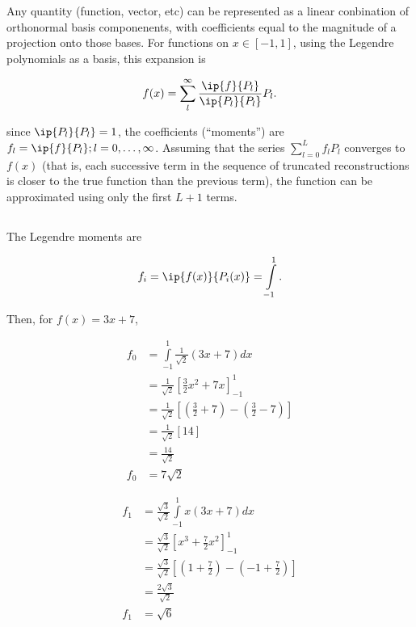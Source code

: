 \documentclass{hw-template}
\begin{document}
Any quantity (function, vector, etc) can be represented as a linear conbination of orthonormal basis componenents, with coefficients equal to the magnitude of a projection onto those bases. For functions on $x\in[-1, 1]$, using the Legendre polynomials as a basis, this expansion is

\begin{equation}
    f(x) = \sum_l^\infty \frac{\ip{f}{P_l}}{\ip{P_l}{P_l}} P_l.
\end{equation}

since $\ip{P_l}{P_l} = 1$, the coefficients (``moments'') are $f_l = \ip{f}{P_l}; l=0, \dots, \infty$. Assuming that the series $\sum_{l=0}^L f_lP_l$ converges to $f(x)$ (that is, each successive term in the sequence of truncated reconstructions is closer to the true function than the previous term), the function can be approximated using only the first $L+1$ terms.

\subsection{}

The Legendre moments are

\begin{equation}
    f_i = \ip{f(x)}{P_i(x)} = \int\limits_{-1}^{1}.
\end{equation}

Then, for $f(x) = 3x+7$, 

\begin{equation}
    \begin{aligned}
      f_0 &= \int\limits_{-1}^{1} \frac{1}{\sqrt{2}}\left(3x + 7 \right)dx\\
    &= \frac{1}{\sqrt{2}}\left[ \frac{3}{2}x^2 + 7x \right]_{-1}^{1}\\
    &= \frac{1}{\sqrt{2}}\left[ \left(\frac{3}{2} + 7\right) - \left(\frac{3}{2} - 7 \right)  \right]\\
    &= \frac{1}{\sqrt{2}}\left[ 14\right]\\
    &= \frac{14}{\sqrt{2}}\\
    f_0 &= 7\sqrt{2}  
    \end{aligned}
\end{equation}

\begin{equation}
    \begin{aligned}
    f_1 &= \frac{\sqrt{3}}{\sqrt{2}}\int\limits_{-1}^{1} x\left(3x + 7 \right)dx\\
    &=\frac{\sqrt{3}}{\sqrt{2}} \left[ x^3 +  \frac{7}{2}x^2\right]_{-1}^{1}\\
    &=\frac{\sqrt{3}}{\sqrt{2}} \left[ \left(1 +\frac{7}{2} \right) - \left(-1 +\frac{7}{2} \right) \right]\\
    &=\frac{2\sqrt{3}}{\sqrt{2}}\\
    f_1 &= \sqrt{6} 
    \end{aligned}
\end{equation}
\end{document}
